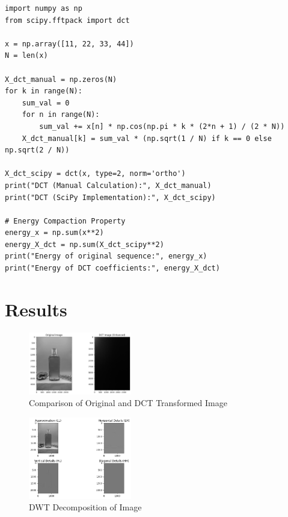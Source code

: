 \documentclass{report}
\begin{document}

\begin{lstlisting}
import numpy as np
from scipy.fftpack import dct

x = np.array([11, 22, 33, 44])
N = len(x)

X_dct_manual = np.zeros(N)
for k in range(N):
    sum_val = 0
    for n in range(N):
        sum_val += x[n] * np.cos(np.pi * k * (2*n + 1) / (2 * N))
    X_dct_manual[k] = sum_val * (np.sqrt(1 / N) if k == 0 else np.sqrt(2 / N))

X_dct_scipy = dct(x, type=2, norm='ortho')
print("DCT (Manual Calculation):", X_dct_manual)
print("DCT (SciPy Implementation):", X_dct_scipy)

# Energy Compaction Property
energy_x = np.sum(x**2)
energy_X_dct = np.sum(X_dct_scipy**2)
print("Energy of original sequence:", energy_x)
print("Energy of DCT coefficients:", energy_X_dct)
\end{lstlisting}

\section{Results}

\begin{figure}[h]
    \centering
        \includegraphics[width=0.4\textwidth]{images/Exp-8-Results-3.png}
    \caption{Comparison of Original and DCT Transformed Image}
\end{figure}

\begin{figure}[h]
    \centering
        \includegraphics[width=0.4\textwidth]{images/Exp-8-Results-2.png}
    \caption{DWT Decomposition of Image}
\end{figure}
\end{document}
